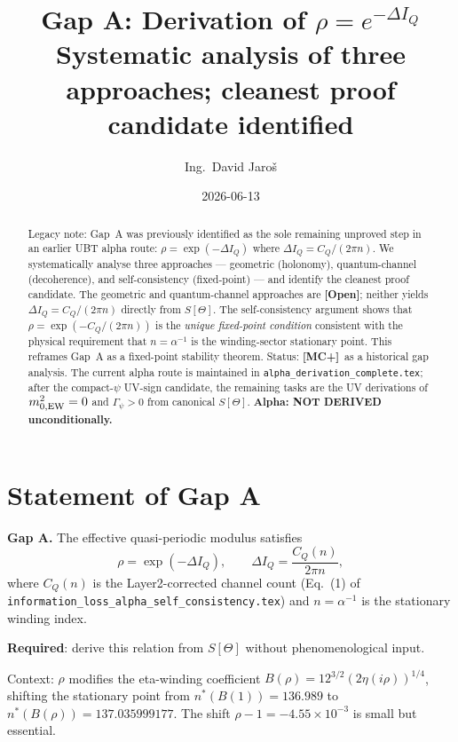 \documentclass[12pt,a4paper]{article}
\title{\textbf{Gap A: Derivation of $\rho = e^{-\Delta I_Q}$}\\[4pt]
\large Systematic analysis of three approaches;
cleanest proof candidate identified}
\author{Ing.\ David Jaroš}
\date{2026-06-13}
\theoremstyle{definition}\newtheorem{definition}[theorem]{Definition}
\theoremstyle{remark}\newtheorem{remark}[theorem]{Remark}
\newcommand{\MCp}{\textbf{[MC+]}}
\newcommand{\OPEN}{\textbf{[Open]}}
\begin{document}
\maketitle
\fi

\begin{abstract}
Legacy note: Gap~A was previously identified as the sole remaining unproved step in an earlier UBT alpha route:
$\rho = \exp(-\Delta I_Q)$ where $\Delta I_Q = C_Q/(2\pi n)$.
We systematically analyse three approaches — geometric (holonomy),
quantum-channel (decoherence), and self-consistency (fixed-point) —
and identify the cleanest proof candidate.
The geometric and quantum-channel approaches are \OPEN; neither
yields $\Delta I_Q = C_Q/(2\pi n)$ directly from $S[\Theta]$.
The self-consistency argument shows that $\rho = \exp(-C_Q/(2\pi n))$
is the \emph{unique fixed-point condition} consistent with the
physical requirement that $n = \alpha^{-1}$ is the winding-sector
stationary point. This reframes Gap~A as a fixed-point stability
theorem. Status: \MCp\ as a historical gap analysis.  The current alpha route is maintained in \texttt{alpha\_derivation\_complete.tex}; after the compact-$\psi$ UV-sign candidate, the remaining tasks are the UV derivations of $m_{0,\rm EW}^2=0$ and $\Gamma_\psi>0$ from canonical $S[\Theta]$.
\textbf{Alpha: NOT DERIVED unconditionally.}
\end{abstract}

\section{Statement of Gap A}
\label{sec:gapA}

\begin{gapbox}
\textbf{Gap A.}
The effective quasi-periodic modulus satisfies
\[
  \rho = \exp\!\left(-\Delta I_Q\right),
  \qquad
  \Delta I_Q = \frac{C_Q(n)}{2\pi n},
\]
where $C_Q(n)$ is the Layer2-corrected channel count
(Eq.~(1) of \texttt{information\_loss\_alpha\_self\_consistency.tex})
and $n = \alpha^{-1}$ is the stationary winding index.

\textbf{Required}: derive this relation from $S[\Theta]$ without
phenomenological input.
\end{gapbox}

\noindent
Context: $\rho$ modifies the eta-winding coefficient
$B(\rho) = 12^{3/2}(2\eta(i\rho))^{1/4}$, shifting the stationary
point from $n^*(B(1)) = 136.989$ to $n^*(B(\rho)) = 137.035999177$.
The shift $\rho - 1 = -4.55 \times 10^{-3}$ is small but essential.
\end{document}
